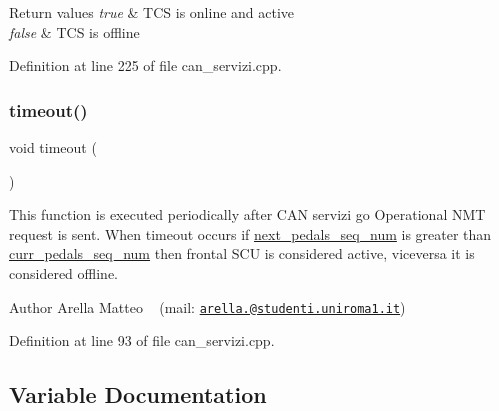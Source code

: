 \begin{DoxyRetVals}{Return values}
{\em true} & T\+CS is online and active \\
\hline
{\em false} & T\+CS is offline \\
\hline
\end{DoxyRetVals}


Definition at line 225 of file can\+\_\+servizi.\+cpp.

\mbox{\label{group___c_a_n__servizi__group_gad446b5782bcb2d8ffc0aa1f8c4d16ded}} 
\subsubsection{\texorpdfstring{timeout()}{timeout()}}
{\footnotesize\ttfamily void timeout (\begin{DoxyParamCaption}{ }\end{DoxyParamCaption})}



This function is executed periodically after C\+AN servizi \textquotesingle{}go Operational\textquotesingle{} N\+MT request is sent. When timeout occurs if \mbox{\hyperlink{group___c_a_n__servizi__group_gadcbd4ad67b50cf61731266bf5c5ba158}{next\+\_\+pedals\+\_\+seq\+\_\+num}} is greater than \mbox{\hyperlink{group___c_a_n__servizi__group_gacad002b7cb06bffa8811859e6f53cb28}{curr\+\_\+pedals\+\_\+seq\+\_\+num}} then frontal S\+CU is considered active, viceversa it is considered offline. 

\begin{DoxyAuthor}{Author}
Arella Matteo ~\newline
 (mail\+: \href{mailto:arella.1646983@studenti.uniroma1.it}{\tt arella.@studenti.\+uniroma1.\+it}) 
\end{DoxyAuthor}


Definition at line 93 of file can\+\_\+servizi.\+cpp.



\subsection{Variable Documentation}
\mbox{\label{group___c_a_n__servizi__group_ga8e50a30864da7026531520887968d4c0}} 
